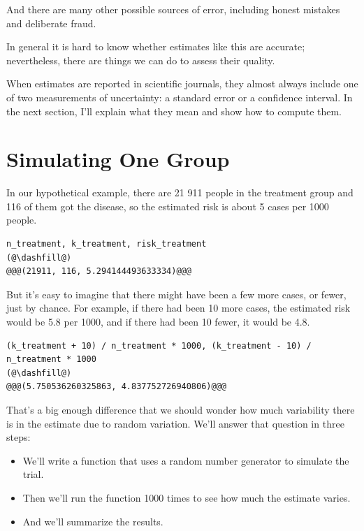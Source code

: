 And there are many other possible sources of error, including honest
mistakes and deliberate fraud.

In general it is hard to know whether estimates like this are accurate;
nevertheless, there are things we can do to assess their quality.

When estimates are reported in scientific journals, they almost always
include one of two measurements of uncertainty: a standard error or a
confidence interval. In the next section, I'll explain what they mean
and show how to compute them.

\hypertarget{simulating-one-group}{%
\section{Simulating One Group}\label{simulating-one-group}}

In our hypothetical example, there are 21 911 people in the treatment
group and 116 of them got the disease, so the estimated risk is about 5
cases per 1000 people.

\begin{lstlisting}[]
n_treatment, k_treatment, risk_treatment
(@\dashfill@)
@@@(21911, 116, 5.294144493633334)@@@
\end{lstlisting}

But it's easy to imagine that there might have been a few more cases, or
fewer, just by chance. For example, if there had been 10 more cases, the
estimated risk would be 5.8 per 1000, and if there had been 10 fewer, it
would be 4.8.

\begin{lstlisting}[]
(k_treatment + 10) / n_treatment * 1000, (k_treatment - 10) / n_treatment * 1000
(@\dashfill@)
@@@(5.750536260325863, 4.837752726940806)@@@
\end{lstlisting}

That's a big enough difference that we should wonder how much
variability there is in the estimate due to random variation. We'll
answer that question in three steps:

\begin{itemize}
\item
  We'll write a function that uses a random number generator to simulate
  the trial.
\item
  Then we'll run the function 1000 times to see how much the estimate
  varies.
\item
  And we'll summarize the results.
\end{itemize}

